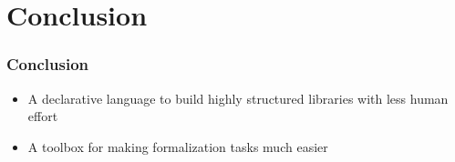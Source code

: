 \documentclass[t,12pt,numbers,fleqn,usenames,xcolor=dvipsnames]{beamer}
\begin{document}
\section{Conclusion}
\begin{frame}[fragile]
\frametitle{Conclusion}
\begin{itemize}
	\item A declarative language to build highly structured libraries with less human effort 
	\item A toolbox for making formalization tasks much easier 
\end{itemize}
\end{frame}
\end{document}
